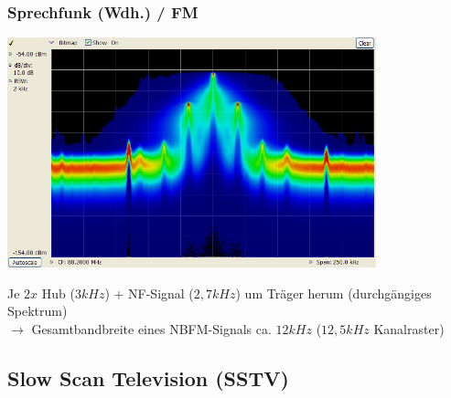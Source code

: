 \begin{frame}
    \frametitle{Sprechfunk (Wdh.) / FM}

    \begin{center}
        \includegraphics[width=0.8\textwidth,height=.55\textheight,keepaspectratio]{e16/Dpx-fm-radio.png}
        \tiny \hyperlink{refs}{\cite{wc}}
    \end{center}

    Je $2x$ Hub ($3 kHz$) + NF-Signal ($2,7 kHz$) um Träger herum
    (durchgängiges Spektrum) \\[1em]
    
    $\rightarrow$ Gesamtbandbreite eines NBFM-Signals ca. $12 kHz$ ($12,5 kHz$
    Kanalraster)

\end{frame}


\subsection[SSTV]{Slow Scan Television (SSTV)}

